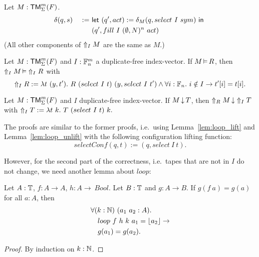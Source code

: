 \begin{definition}[$\LiftTapes{M}{I}$]
  \label{def:LiftTapes}
  Let $M:\TM_\Sigma^m(F)$.
  \begin{alignat*}{2}
    &\delta(q,s) &~:=~& \Let{(q', act) := \delta_M(q, select~I~sym)}{\\%
    &            &~  ~& (q', fill~I~(\None,N)^n~act)}
  \end{alignat*}
  (All other components of $\LiftTapes{M}{I}$ are the same as $M$.)
\end{definition}

\begin{lemma}
  \label{lem:LiftTapes_Realise}
  Let $M : \TM_\Sigma^m(F)$ and $I : \Fin_n^m$ a duplicate-free index-vector.  If $M \Realise R$, then $\LiftTapes{M}{I} \Realise \LiftTapes{R}{I}$ with
  \[
    \LiftTapes{R}{I} := \lambda t~(y,t').~ R~(select~I~t)~(y, select~I~t') \land \forall i:\Fin_n.~i \notin I \rightarrow t'[i]=t[i].
  \]
\end{lemma}

\begin{lemma}
  \label{lem:LiftTapes_TerminatesIn}
  Let $M : \TM_\Sigma^m(F)$ and $I$ duplicate-free index-vector. If $M \TerminatesIn T$, then $\LiftTapes{M}{R} \TerminatesIn \LiftTapes{T}{I}$ with
  $
    \LiftTapes{T}{I} := \lambda t~k.~ T~(select~I~t)~k.
  $
\end{lemma}

The proofs are similar to the former proofs, i.e.\ using Lemma~\ref{lem:loop_lift} and Lemma~\ref{lem:loop_unlift} with the following configuration
lifting function:
\[
  selectConf(q,t) := (q, select~I~t).
\]

However, for the second part of the correctness, i.e.\ tapes that are not in $I$ do not change, we need another lemma about $loop$:

\begin{lemma}
  \label{lem:loop_map}
  Let $A:\Type$, $f:A \to A$, $h:A \to\ Bool$.  Let $B:\Type$ and $g : A \to B$.  If $g(f~a)=g(a)$ for all $a:A$, then
  \begin{alignat*}{1}
    & \forall (k:\Nat)~(a_1~a_2 : A). \\
    & \quad loop~f~h~k~a_1 = \Some{a_2} \rightarrow \\
    & \quad g(a_1) = g(a_2).
  \end{alignat*}
\end{lemma}
\begin{proof}
  By induction on $k:\Nat$.
\end{proof}

